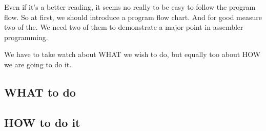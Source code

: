 Even if it's a better reading, it seems no really to be easy to follow the program flow. So at first, we should introduce a program flow chart. And for good measure two of the. We need two of them to demonstrate a major point in assembler programming.

We have to take watch about WHAT we wish to do, but equally too about HOW we are going to do it.

\subsection{WHAT to do}

\subsection{HOW to do it}

